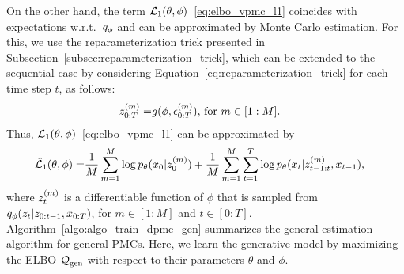 On the other hand, the term $\mathcal{L}_1(\theta,\phi)$~\eqref{eq:elbo_vpmc_l1} 
coincides with
expectations w.r.t.~$q_\phi$ and can be approximated by Monte Carlo estimation.
For this, we use the reparameterization trick
presented in Subsection~\ref{subsec:reparameterization_trick},
which can be extended to the sequential case by considering
Equation~\eqref{eq:reparameterization_trick} for each time 
step $t$, as follows:
\begin{align}
    \label{eq:reparametrization_vpmc}
    z_{0:T}^{(m)} =& g(\phi, \epsilon_{0:T}^{(m)}) \text{, for } m \in [1:M] \text{.}
\end{align}
Thus, $\mathcal{L}_1(\theta,\phi)$~\eqref{eq:elbo_vpmc_l1}
can be approximated by
\begin{align}
    \label{eq:elbo-pmc-mc-1}
    \hat{\mathcal{L}}_1(\theta,\phi) =& \frac{1}{M} \sum_{m=1}^M  \log p_{\theta}(x_0| z_0^{(m)})
    +\frac{1}{M} \sum_{m=1}^M  \sum_{t=1}^T  
    \log p_{\theta}(x_t|z_{t-1:t}^{(m)},x_{t-1} ) \text{,}
\end{align}
where $z_{t}^{(m)}$ is a differentiable function of $\phi$ that is sampled from
$q_\phi(z_{t}|z_{0:t-1},x_{0:T})$, for $m \in [1:M]$ and $t \in [0:T]$.
Algorithm~\ref{algo:algo_train_dpmc_gen} 
summarizes the general estimation algorithm
for  general PMCs. Here, we learn the generative model by maximizing the
ELBO $\mathcal{Q}_{\mathrm{gen}}$ with respect to their parameters $\theta$ and $\phi$.




